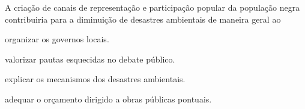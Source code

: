 \pagebreak
A criação de canais de representação e participação popular da população
negra contribuiria para a diminuição de desastres ambientais de maneira
geral ao

\begin{escolha}
\item  organizar os governos locais.

\item  valorizar pautas esquecidas no debate público.

\item  explicar os mecanismos dos desastres ambientais.

\item  adequar o orçamento dirigido a obras públicas pontuais.
\end{escolha}